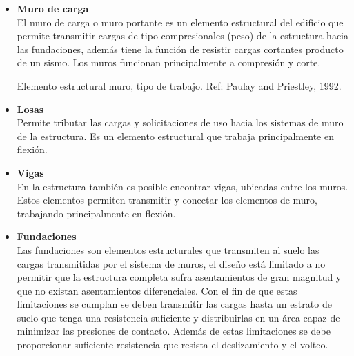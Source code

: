 \begin{itemize}
    \item \textbf{Muro de carga}\\
    El muro de carga o muro portante es un elemento estructural del edificio que permite transmitir cargas de tipo compresionales (peso) de la estructura hacia las fundaciones, además tiene la función de resistir cargas cortantes producto de un sismo. Los muros funcionan principalmente a compresión y corte.
    
    \begin{images}{Elemento estructural muro, tipo de trabajo. Ref: Paulay and Priestley, 1992.}
\end{images}
    \item \textbf{Losas}\\
    Permite tributar las cargas y solicitaciones de uso hacia los sistemas de muro de la estructura. Es un elemento estructural que trabaja principalmente en flexión.
    
    \item \textbf{Vigas}\\
    En la estructura también es posible encontrar vigas, ubicadas entre los muros. Estos elementos permiten transmitir y conectar los elementos de muro, trabajando principalmente en flexión.
    
    \item \textbf{Fundaciones}\\
    Las fundaciones son elementos estructurales que transmiten al suelo las cargas transmitidas por el sistema de muros, el diseño está limitado a no permitir que la estructura completa sufra asentamientos de gran magnitud y que no existan asentamientos diferenciales. Con el fin de que estas limitaciones se cumplan se deben transmitir las cargas hasta un estrato de suelo que tenga una resistencia suficiente y distribuirlas en un área capaz de minimizar las presiones de contacto. Además de estas limitaciones se debe proporcionar suficiente resistencia que resista el deslizamiento y el volteo.
\end{itemize}